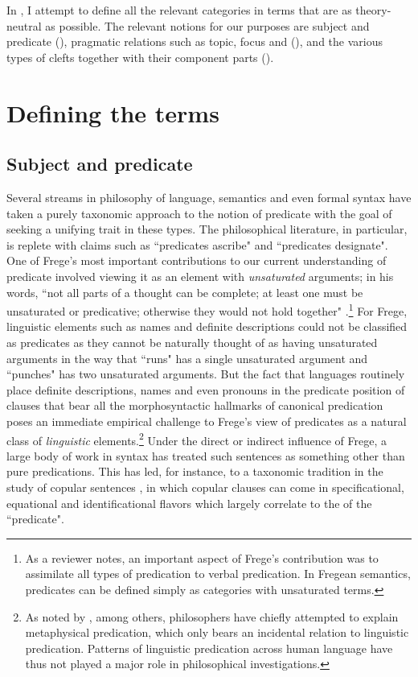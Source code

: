 \documentclass[output=paper]{langsci/langscibook}
\begin{document}
In , I attempt to define all the relevant categories in terms that are as theory-neutral as possible. The relevant notions for our purposes are subject and predicate (), pragmatic relations such as topic, focus and  (), and the various types of clefts together with their component parts ().

\section{\label{s:kaufman:2}Defining the terms}
\subsection{\label{s:kaufman:2.1}Subject and predicate}
Several streams in philosophy of language, semantics and even formal syntax have taken a purely taxonomic approach to the notion of predicate with the goal of seeking a unifying trait in these types. The philosophical literature, in particular, is replete with claims such as ``predicates ascribe" and ``predicates designate". One of Frege's most important contributions to our current understanding of predicate involved viewing it as an element with \emph{unsaturated} arguments; in his words, ``not all parts of a thought can be complete; at least one must be unsaturated or predicative; otherwise they would not hold together" \citep[193]{Frege:1892}.\footnote{As a reviewer notes, an important aspect of Frege's contribution was to assimilate all types of predication to verbal predication. In Fregean semantics, predicates can be defined simply as categories with unsaturated terms.} For Frege, linguistic elements such as names and definite descriptions could not be classified as predicates as they cannot be naturally thought of as having unsaturated arguments in the way that ``runs" has a single unsaturated argument and ``punches" has two unsaturated arguments. But the fact that languages routinely place definite descriptions, names and even pronouns in the predicate position of clauses that bear all the morphosyntactic hallmarks of canonical predication poses an immediate empirical challenge to Frege's view of predicates as a natural class of \emph{linguistic} elements.\footnote{As noted by \citet{Modrak:1985}, among others, philosophers have chiefly attempted to explain metaphysical predication, which only bears an incidental relation to linguistic predication. Patterns of linguistic predication across human language have thus not played a major role in philosophical investigations.} Under the direct or indirect influence of Frege, a large body of work in syntax has treated such sentences as something other than pure predications. This has led, for instance, to a taxonomic tradition in the study of copular sentences \citep{Mikkelsen:2011a}, in which copular clauses can come in specificational, equational and identificational flavors which largely correlate to the  of the ``predicate". 
\end{document}
